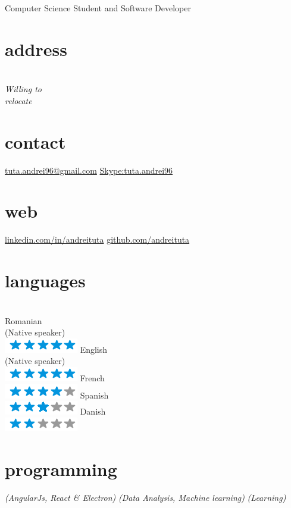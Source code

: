 \documentclass[]{friggeri-cv}
\begin{document}
       {Computer Science Student and Software Developer}


\begin{aside}
  \section{address}
    \\
    \emph{Willing to \\relocate}
    ~
    \section{contact}
    \href{mailto:tuta.andrei96@gmail.com}{tuta.andrei96@gmail.com}
    \href{Skype : tuta.andrei96}{Skype:tuta.andrei96}
    ~
    \section{web}
    \href{http://linkedin.com/in/andreituta}{linkedin.com/in/andreituta}
    \href{http://github.com/andreituta}{github.com/andreituta}
    ~ 
    
  \section{languages} 
  \\Romanian \\(Native speaker)  \\ \includegraphics[scale=0.30]{img/5stars.png}
  English \\(Native speaker) \\ \includegraphics[scale=0.30]{img/5stars.png}
  French \\ \includegraphics[scale=0.30]{img/4stars.png}
  Spanish \\ \includegraphics[scale=0.30]{img/3stars.png}
  Danish \\ \includegraphics[scale=0.30]{img/2stars.png}
    ~
    
  \section{programming}
    \emph{(AngularJs, React \& Electron)}
     \emph{(Data Analysis, Machine learning)}
     \emph{(Learning)}
    ~

\end{aside}
\end{document}
